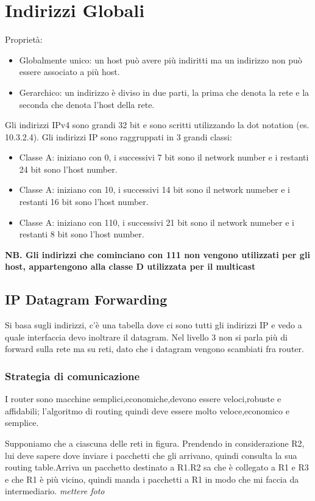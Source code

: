 \section{Indirizzi Globali}
Proprietà:
\begin{itemize}
  \item Globalmente unico: un host può avere più indiritti ma un indirizzo non può essere associato a più host.
  \item Gerarchico: un indirizzo è diviso in due parti, la prima che denota la rete e la seconda che denota l'host della rete.
\end{itemize}
Gli indirizzi IPv4 sono grandi 32 bit e sono scritti utilizzando la dot notation (es. 10.3.2.4). Gli indirizzi IP sono raggruppati in 3 grandi classi:
\begin{itemize}
  \item Classe A: iniziano con 0, i successivi 7 bit sono il network number e i restanti 24 bit sono l'host number.
  \item Classe A: iniziano con 10, i successivi 14 bit sono il network numeber e i restanti 16 bit sono l'host number.
  \item Classe A: iniziano con 110, i successivi 21 bit sono il network numeber e i restanti 8 bit sono l'host number.
\end{itemize}
\textbf{NB. Gli indirizzi che cominciano con 111 non vengono utilizzati per gli host, appartengono alla classe D utilizzata per il multicast}
\subsection{IP Datagram Forwarding}
Si basa sugli indirizzi, c'è una tabella dove ci sono tutti gli indirizzi IP e vedo a quale interfaccia devo inoltrare il datagram. Nel livello 3 non si parla più di forward sulla rete ma su reti, dato che i datagram vengono scambiati fra router.
\subsubsection{Strategia di comunicazione}
I router sono macchine semplici,economiche,devono essere veloci,robuste e affidabili; l'algoritmo di routing quindi deve essere molto veloce,economico e semplice.
\begin{example} 
  Supponiamo che a ciascuna delle reti in figura. Prendendo in considerazione R2, lui deve sapere dove inviare i pacchetti che gli arrivano, quindi consulta la sua routing table.Arriva un pacchetto destinato a R1.R2 sa che è collegato a R1 e R3 e che R1 è più vicino, quindi manda i pacchetti a R1 in modo che mi faccia da intermediario.
  \textit{mettere foto} \\
\end{example}
